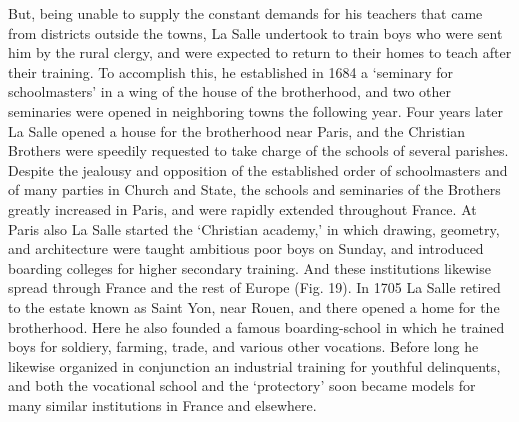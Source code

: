 \documentclass[
]{book}
\begin{document}
But, being unable to supply the constant demands for his teachers that came from districts outside the towns, La Salle undertook to train boys who were sent him by the rural clergy, and were expected to return to their homes to teach after their training. To accomplish this, he established in 1684 a `seminary for schoolmasters' in a wing of the house of the brotherhood, and two other seminaries were opened in neighboring towns the following year. Four years later La Salle opened a house for the brotherhood near Paris, and the Christian Brothers were speedily requested to take charge of the schools of several parishes. Despite the jealousy and opposition of the established order of schoolmasters and of many parties in Church and State, the schools and seminaries of the Brothers greatly increased in Paris, and were rapidly extended throughout France. At Paris also La Salle started the `Christian academy,' in which drawing, geometry, and architecture were taught ambitious poor boys on Sunday, and introduced boarding colleges for higher secondary training. And these institutions likewise spread through France and the rest of Europe (Fig. 19). In 1705 La Salle retired to the estate known as Saint Yon, near Rouen, and there opened a home for the brotherhood. Here he also founded a famous boarding-school in which he trained boys for soldiery, farming, trade, and various other vocations. Before long he likewise organized in conjunction an industrial training for youthful delinquents, and both the vocational school and the `protectory' soon became models for many similar institutions in France and elsewhere.
\end{document}
